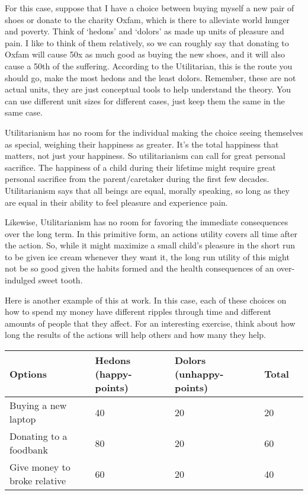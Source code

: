 For this case, suppose that I have a choice between buying myself a new pair of shoes or donate to the charity Oxfam, which is there to alleviate world hunger and poverty. Think of `hedons' and `dolors' as made up units of pleasure and pain. I like to think of them relatively, so we can roughly say that donating to Oxfam will cause 50x as much good as buying the new shoes, and it will also cause a 50th of the suffering. According to the Utilitarian, this is the route you should go, make the most hedons and the least dolors.  Remember, these are not actual units, they are just conceptual tools to help understand the theory. You can use different unit sizes for different cases, just keep them the same in the same case.

Utilitarianism has no room for the individual making the choice seeing themselves as special, weighing their happiness as greater. It’s the total happiness that matters, not just your happiness. So utilitarianism can call for great personal sacrifice. The happiness of a child during their lifetime might require great personal sacrifice from the parent/caretaker during the first few decades. Utilitarianism says that all beings are equal, morally speaking, so long as they are equal in their ability to feel pleasure and experience pain.

Likewise, Utilitarianism has no room for favoring the immediate consequences over the long term. In this primitive form, an actions utility covers all time after the action. So, while it might maximize a small child’s pleasure in the short run to be given ice cream whenever they want it, the long run utility of this might not be so good given the habits formed and the health consequences of an over-indulged sweet tooth.

Here is another example of this at work. In this case, each of these choices on how to spend my money have different ripples through time and different amounts of people that they affect. For an interesting exercise, think about how long the results of the actions will help others and how many they help.
	
\begin{tabular}{p{1in}|p{1.5in}|p{1.5in}|p{1in}|p{1in}}
Options&Hedons (happy-points)&Dolors (unhappy-points)&Total\\\hline
Buying a new laptop&40&20&20\\
Donating to a foodbank&80&20&60\\
Give money to broke relative&60&20&40
\end{tabular}

